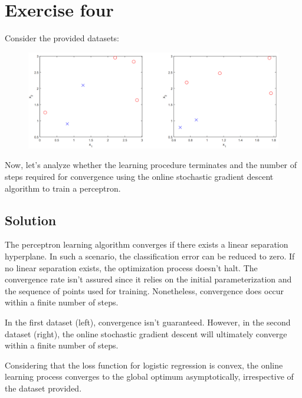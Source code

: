 \section{Exercise four}

Consider the provided datasets:
\begin{figure}[H]
    \centering
    \includegraphics[width=0.75\linewidth]{images/class.png}
\end{figure}
Now, let's analyze whether the learning procedure terminates and the number of steps required for convergence using the online stochastic gradient descent algorithm to train a perceptron.

\subsection*{Solution}
The perceptron learning algorithm converges if there exists a linear separation hyperplane. In such a scenario, the classification error can be reduced to zero. 
If no linear separation exists, the optimization process doesn't halt. 
The convergence rate isn't assured since it relies on the initial parameterization and the sequence of points used for training. 
Nonetheless, convergence does occur within a finite number of steps.

In the first dataset (left), convergence isn't guaranteed. 
However, in the second dataset (right), the online stochastic gradient descent will ultimately converge within a finite number of steps.

Considering that the loss function for logistic regression is convex, the online learning process converges to the global optimum asymptotically, irrespective of the dataset provided.